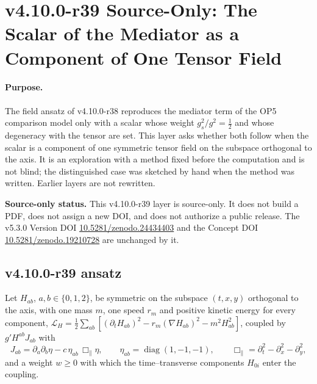 \clearpage
\section*{v4.10.0-r39 Source-Only: The Scalar of the Mediator as a Component of One Tensor Field}
\label{sec:v4100-r39-single-tensor}

\paragraph{Purpose.}
The field ansatz of v4.10.0-r38 reproduces the mediator term of the OP5 comparison model only with a scalar whose weight \(g_s^2/g^2=\tfrac12\) and
whose degeneracy with the tensor are set.  This layer asks whether both follow when the scalar is a component of one symmetric tensor field on
the subspace orthogonal to the axis.  It is an exploration with a method fixed before the computation and is not blind; the distinguished case
was sketched by hand when the method was written.  Earlier layers are not rewritten.

\noindent\textbf{Source-only status.}
This v4.10.0-r39 layer is source-only.  It does not build a PDF, does not assign a new DOI,
and does not authorize a public release.  The v5.3.0 Version DOI
\href{https://doi.org/10.5281/zenodo.24434403}{10.5281/zenodo.24434403} and the Concept DOI
\href{https://doi.org/10.5281/zenodo.19210728}{10.5281/zenodo.19210728} are unchanged by it.

\subsection*{v4.10.0-r39 ansatz}
\label{subsec:v4100-r39-ansatz}

Let \(H_{ab}\), \(a,b\in\{0,1,2\}\), be symmetric on the subspace \((t,x,y)\) orthogonal to the axis, with one mass \(m\), one speed \(r_m\) and positive
kinetic energy for every component, \(\mathcal L_H=\tfrac12\sum_{ab}[(\partial_tH_{ab})^2-r_m(\nabla H_{ab})^2-m^2H_{ab}^2]\), coupled by \(g'H^{ab}J_{ab}\) with
\[
 J_{ab}=\partial_a\partial_b\eta-c\,\eta_{ab}\,\Box_\parallel\eta,\qquad \eta_{ab}=\operatorname{diag}(1,-1,-1),\qquad \Box_\parallel=\partial_t^2-\partial_x^2-\partial_y^2,
\]
and a weight \(w\ge0\) with which the time--transverse components \(H_{0i}\) enter the coupling.

